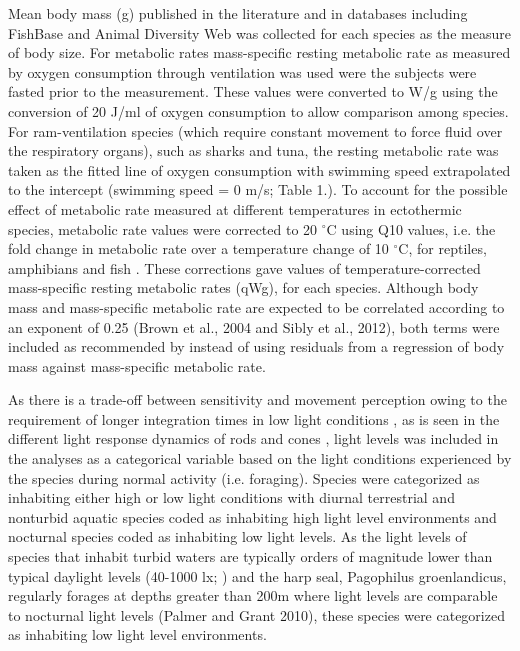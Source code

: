 Mean body mass (g) published in the literature and in databases including FishBase \citep{froese2012fishbase} and Animal Diversity Web \citep{myers2006animal} was collected for each species as the measure of body size. For metabolic rates mass-specific resting metabolic rate as measured by oxygen consumption through ventilation  was used were the subjects were fasted prior to the measurement. These values were converted to W/g using the conversion of 20 J/ml of oxygen consumption \citep{makarieva2008mean} to allow comparison among species. For ram-ventilation species (which require constant movement to force fluid over the respiratory organs), such as sharks and tuna, the resting metabolic rate was taken as the fitted line of oxygen consumption with swimming speed extrapolated to the intercept (swimming speed = 0 m/s; Table 1.). To account for the possible effect of metabolic rate measured at different temperatures in ectothermic species, metabolic rate values were corrected to 20 $^{\circ}$C using Q10 values, i.e. the fold change in metabolic rate over a temperature change of 10 $^{\circ}$C, for reptiles, amphibians and fish \citep{white2006scaling}. These corrections gave values of temperature-corrected mass-specific resting metabolic rates (qWg), for each species. Although body mass and mass-specific metabolic rate are expected to be correlated according to an exponent of 0.25 \citep{brown2004, sibly2012metabolic} (Brown et al., 2004 and Sibly et al., 2012), both terms were included as recommended by \cite{freckleton2009seven} instead of using residuals from a regression of body mass against mass-specific metabolic rate.

As there is a trade-off between sensitivity and movement perception owing to the requirement of longer integration times in low light conditions \citep{tansley1965vision}, as is seen in the different light response dynamics of rods and cones \citep{rubene2010presence}, light levels was included in the analyses as a categorical variable based on the light conditions experienced by the species during normal activity (i.e. foraging). Species were categorized as inhabiting either high or low light conditions with diurnal terrestrial and nonturbid aquatic species coded as inhabiting high light level environments and nocturnal species coded as inhabiting low light levels. As the light levels of species that inhabit turbid waters are typically orders of magnitude lower than typical daylight levels (40-1000 lx; \citealt{ali1985vision,palmer2010art,kreysing2012photonic}) and the harp seal, Pagophilus groenlandicus, regularly forages at depths greater than 200m \citep{folkow2004distribution} where light levels are comparable to nocturnal light levels (Palmer and Grant 2010), these species were categorized as inhabiting low light level environments.


